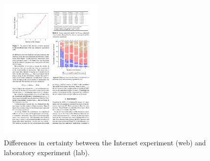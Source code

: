\begin{figure}[t]
\centering
\vspace{2.5pt}

\includegraphics[width=0.45\textwidth]{Chapters/07_Analysis_Experiment/plotdata/certainty.pdf}
\caption{Differences in certainty between the Internet experiment (web) and laboratory experiment (lab).}
\label{figure:certainty_web_iis}
\end{figure}

